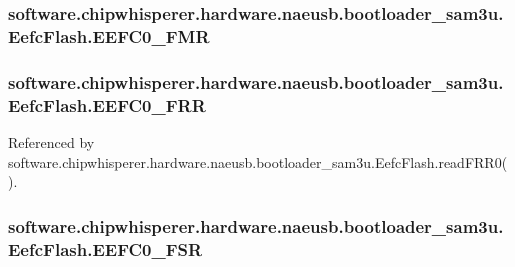 \subsubsection[{E\+E\+F\+C0\+\_\+\+F\+M\+R}]{\setlength{\rightskip}{0pt plus 5cm}software.\+chipwhisperer.\+hardware.\+naeusb.\+bootloader\+\_\+sam3u.\+Eefc\+Flash.\+E\+E\+F\+C0\+\_\+\+F\+M\+R}\label{classsoftware_1_1chipwhisperer_1_1hardware_1_1naeusb_1_1bootloader__sam3u_1_1EefcFlash_a3a30b9250f919b8555a00397480fe313}
\hypertarget{classsoftware_1_1chipwhisperer_1_1hardware_1_1naeusb_1_1bootloader__sam3u_1_1EefcFlash_a7b748bb0cef7668516749e3f6b120521}{}
\subsubsection[{E\+E\+F\+C0\+\_\+\+F\+R\+R}]{\setlength{\rightskip}{0pt plus 5cm}software.\+chipwhisperer.\+hardware.\+naeusb.\+bootloader\+\_\+sam3u.\+Eefc\+Flash.\+E\+E\+F\+C0\+\_\+\+F\+R\+R}\label{classsoftware_1_1chipwhisperer_1_1hardware_1_1naeusb_1_1bootloader__sam3u_1_1EefcFlash_a7b748bb0cef7668516749e3f6b120521}


Referenced by software.\+chipwhisperer.\+hardware.\+naeusb.\+bootloader\+\_\+sam3u.\+Eefc\+Flash.\+read\+F\+R\+R0().

\hypertarget{classsoftware_1_1chipwhisperer_1_1hardware_1_1naeusb_1_1bootloader__sam3u_1_1EefcFlash_a4ebdc6128724b7204c0b1eddb395cdb7}{}
\subsubsection[{E\+E\+F\+C0\+\_\+\+F\+S\+R}]{\setlength{\rightskip}{0pt plus 5cm}software.\+chipwhisperer.\+hardware.\+naeusb.\+bootloader\+\_\+sam3u.\+Eefc\+Flash.\+E\+E\+F\+C0\+\_\+\+F\+S\+R}\label{classsoftware_1_1chipwhisperer_1_1hardware_1_1naeusb_1_1bootloader__sam3u_1_1EefcFlash_a4ebdc6128724b7204c0b1eddb395cdb7}


